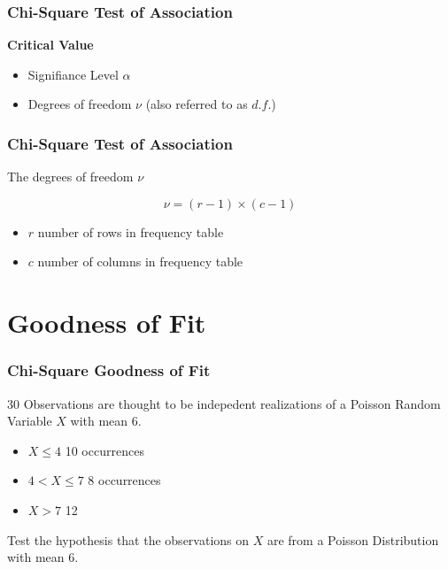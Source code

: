 \documentclass[a4]{beamer}
\begin{document}
\begin{frame}
\frametitle{Chi-Square Test of Association}

\Large
\textbf{Critical Value}

\begin{itemize}
\item Signifiance Level $\alpha$
\item Degrees of freedom $\nu$ (also referred to as $d.f.$)
\end{itemize}

\end{frame}
\begin{frame}
\frametitle{Chi-Square Test of Association}
\Large
\vspace{-1cm}
The degrees of freedom $\nu$

\[ \nu  = (r-1) \times (c-1) \]


\begin{itemize}
\item $r$ number of rows in frequency table
\item $c$ number of columns in frequency table
\end{itemize}

\end{frame}

\section{Goodness of Fit}
\begin{frame}
\frametitle{Chi-Square Goodness of Fit}
\Large
\vspace{-1cm}
30 Observations are thought to be indepedent realizations of a Poisson Random Variable $X$ with mean 6.

\begin{itemize}
\item $X \leq 4$ 10 occurrences
\item $4 < X \leq 7$ 8 occurrences
\item $ X >7$ 12
\end{itemize}
Test the hypothesis that the observations on $X$ are from a Poisson Distribution with mean 6.
\end{frame}
\end{document}
